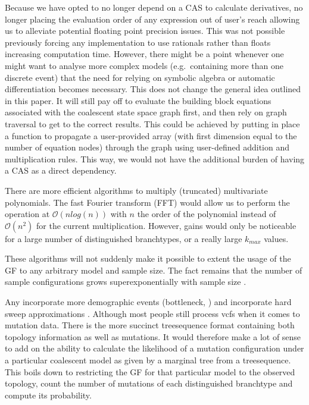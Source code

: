 \documentclass[10pt, a4]{article}
\begin{document}
Because we have opted to no longer depend on a CAS to calculate derivatives, no longer placing the evaluation order of any expression out of user's reach allowing us to alleviate potential floating point precision issues. This was not possible previously forcing any implementation to use rationals rather than floats increasing computation time.
However, there might be a point whenever one might want to analyse more complex models (e.g.\ containing more than one discrete event) that the need for relying on symbolic algebra or automatic differentiation becomes necessary. This does not change the general idea outlined in this paper. It will still pay off to evaluate the building block equations associated with the coalescent state space graph first, and then rely on graph traversal to get to the correct results. This could be achieved by putting in place a function to propagate a user-provided array (with first dimension equal to the number of equation nodes) through the graph using user-defined addition and multiplication rules. This way, we would not have the additional burden of having a CAS as a direct dependency.

There are more efficient algorithms to multiply (truncated) multivariate polynomials. The fast Fourier transform (FFT) would allow us to perform the operation at $\mathcal{O}(n log(n))$ with $n$ the order of the polynomial instead of $\mathcal{O}(n^2)$ for the current multiplication. However, gains would only be noticeable for a large number of distinguished branchtypes, or a really large $k_{max}$ values. 
\newline

These algorithms will not suddenly make it possible to extent the usage of the GF to any arbitrary model and sample size. The fact remains that the number of sample configurations grows superexponentially with sample size \citep{Lohse2016}. %
\newline

Any
incorporate more demographic events (bottleneck, ) and incorporate hard sweep approximations \citep{Bisschop2021}.
Although most people still process vcfs when it comes to mutation data. There is the more succinct treesequence format containing both topology information as well as mutations. It would therefore make a lot of sense to add on the ability to calculate the likelihood of a mutation configuration under a particular coalescent model as given by a marginal tree from a treesequence. This boils down to restricting the GF for that particular model to the observed topology, count the number of mutations of each distinguished branchtype and compute its probability.
\end{document}
